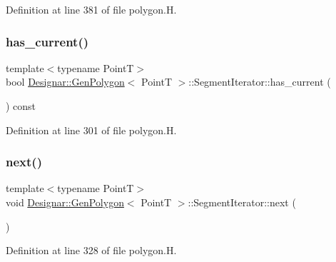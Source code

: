 Definition at line 381 of file polygon.\+H.

\mbox{\label{class_designar_1_1_gen_polygon_1_1_segment_iterator_a5a00faaa26edbf38c59d8d578e8e7d1b}} 
\subsubsection{\texorpdfstring{has\+\_\+current()}{has\_current()}}
{\footnotesize\ttfamily template$<$typename PointT$>$ \\
bool \hyperlink{class_designar_1_1_gen_polygon}{Designar\+::\+Gen\+Polygon}$<$ PointT $>$\+::Segment\+Iterator\+::has\+\_\+current (\begin{DoxyParamCaption}{ }\end{DoxyParamCaption}) const\hspace{0.3cm}{\ttfamily [inline]}}



Definition at line 301 of file polygon.\+H.

\mbox{\label{class_designar_1_1_gen_polygon_1_1_segment_iterator_a29ad4efa177e5747bbd3fb181924f452}} 
\subsubsection{\texorpdfstring{next()}{next()}}
{\footnotesize\ttfamily template$<$typename PointT$>$ \\
void \hyperlink{class_designar_1_1_gen_polygon}{Designar\+::\+Gen\+Polygon}$<$ PointT $>$\+::Segment\+Iterator\+::next (\begin{DoxyParamCaption}{ }\end{DoxyParamCaption})\hspace{0.3cm}{\ttfamily [inline]}}



Definition at line 328 of file polygon.\+H.

